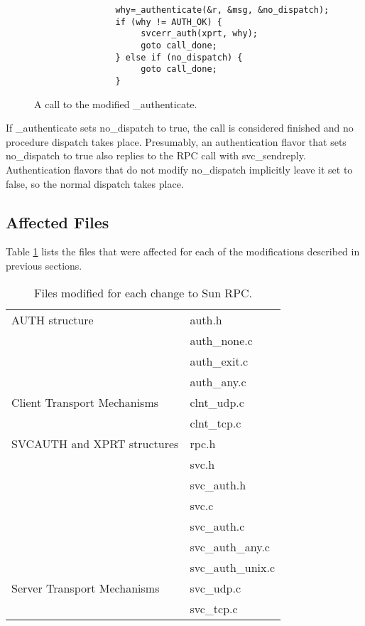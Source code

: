 \begin{figure}[htbp]
\begin{verbatim}
                why=_authenticate(&r, &msg, &no_dispatch);
                if (why != AUTH_OK) {
                     svcerr_auth(xprt, why);
                     goto call_done;
                } else if (no_dispatch) {
                     goto call_done;
                }
\end{verbatim}
\caption{A call to the modified _authenticate.}
\label{fig:authenticate}
\end{figure}

If _authenticate sets no_dispatch to true, the call is considered
finished and no procedure dispatch takes place.  Presumably, an
authentication flavor that sets no_dispatch to true also replies to
the RPC call with svc_sendreply.  Authentication flavors that do not
modify no_dispatch implicitly leave it set to false, so the normal
dispatch takes place.

\subsection{Affected Files}

Table \ref{tab:modfiles} lists the files that were
affected for each of the modifications described in previous sections.

\begin{table}[htbp]
\centering
\caption{Files modified for each change to Sun RPC.}
\label{tab:modfiles}
\begin{tabular}{ll}
AUTH structure                  & auth.h \\
                                & auth_none.c \\
                                & auth_exit.c \\
                                & auth_any.c \\
Client Transport Mechanisms     & clnt_udp.c \\
                                & clnt_tcp.c \\
SVCAUTH and XPRT structures     & rpc.h \\
                                & svc.h \\
                                & svc_auth.h \\
                                & svc.c \\
                                & svc_auth.c \\
                                & svc_auth_any.c \\
                                & svc_auth_unix.c \\
Server Transport Mechanisms     & svc_udp.c \\
                                & svc_tcp.c
\end{tabular}
\end{table}

